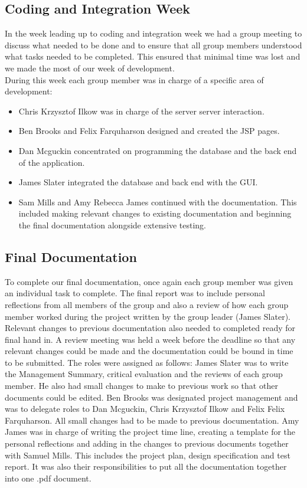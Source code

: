 \documentclass[titlepage]{article}
\begin{document}
{\subsection{Coding and Integration Week}
In the week leading up to coding and integration week we had a group meeting to discuss what needed to be done and to ensure that all group members understood what tasks needed to be completed. This ensured that minimal time was lost and we made the most of our week of development.\\
During this week each group member was in charge of a specific area of development:
\begin{itemize}
\item Chris Krzysztof Ilkow was in charge of the server server interaction.
\item Ben Brooks and Felix Farquharson designed and created the JSP pages.
\item Dan Mcguckin concentrated on programming the database and the back end of the application.
\item James Slater integrated the database and back end with the GUI.
\item Sam Mills and Amy Rebecca James continued with the documentation. This included making relevant changes to existing documentation and beginning the final documentation alongside extensive testing.
\end{itemize}
\subsection{Final Documentation}
To complete our final documentation, once again each group member was given an individual task to complete. The final report was to include personal reflections from all members of the group and also a review of how each group member worked during the project written by the group leader (James Slater). Relevant changes to previous documentation also needed to completed ready for final hand in. A review meeting was held a week before the deadline so that any relevant changes could be made and the documentation could be bound in time to be submitted.
The roles were assigned as follows:
\newline
\newline
James Slater was to write the Management Summary, critical evaluation and the reviews of each group member. He also had small changes to make to previous work so that other documents could be edited.
Ben Brooks was designated project management and was to delegate roles to Dan Mcguckin, Chris Krzysztof Ilkow and Felix Felix Farquharson. All small changes had to be made to previous documentation. 
Amy James was in charge of writing the project time line, creating a template for the personal reflections and adding in the changes to previous documents together with Samuel Mills. This includes the project plan, design specification and test report. It was also their responsibilities to put all the documentation together into one .pdf document.
}
\end{document}
